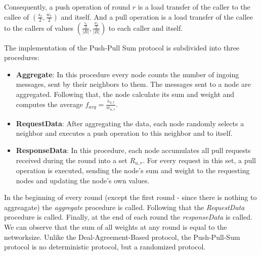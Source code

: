 Consequently, a push operation of round $r$ is a load transfer of the caller to the callee of $\left(\frac{s_{r}}{2}, \frac{w_{r}}{2}\right)$ and itself. And a pull operation is a load transfer of the callee to the callers of values $\left(\frac{\frac{s_{r}}{2}}{|R|}, \frac{\frac{w_{r}}{2}}{|R|}\right)$ to each caller and itself.

The implementation of the Push-Pull Sum protocol is subdivided into three procedures:
\begin{itemize}
    \item \textbf{Aggregate}: In this procedure every node counts the number of ingoing messages, sent by their neighbors to them. The messages sent to a node are aggregated. Following that, the node calculate its sum and weight and computes the average $f_{avg} = \frac{s_{u, r}}{w_{u, r}}$.
    \item \textbf{RequestData}: After aggregating the data, each node randomly selects a neighbor and executes a push operation to this neighbor and to itself.
    \item \textbf{ResponseData}: In this procedure, each node accumulates all pull requests received during the round into a set $R_{u, r}$. For every request in this set, a pull operation is executed, sending the node's sum and weight to the requesting nodes and updating the node's own values.
\end{itemize}
In the beginning of every round (except the first round - since there is nothing to aggreagate) the \textit{aggregate} procedure is called. Following that the \textit{RequestData} procedure is called. Finally, at the end of each round the \textit{responseData} is called. We can observe that the sum of all weights at any round is equal to the networksize. Unlike the Deal-Agreement-Based protocol, the Push-Pull-Sum protocol is no deterministic protocol, but a randomized protocol.
